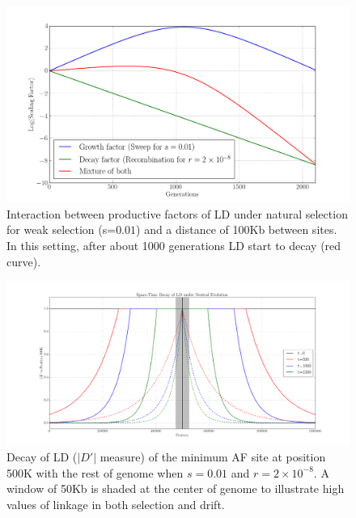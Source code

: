 \documentclass[11pt]{article}
\begin{document}
\begin{figure}
	\centering
	\includegraphics[width=\textwidth]{decayFactors}
	\caption{Interaction between productive factors of LD under natural 
	selection for weak selection (s=$0.01$) and a distance of 100Kb between 
	sites. In this setting, after about 1000 generations LD start to decay (red 
	curve).} \label{fig:ldf}
\end{figure}


\begin{figure}
	\centering
	\includegraphics[width=\textwidth]{LDDecay2d}
	\caption{Decay of LD ($|D'|$ measure) of the minimum AF site at position 
	500K with the rest of genome when $s=0.01$ and $r=2\times10^{-8}$. A window 
	of 50Kb is shaded at the center of genome to illustrate high values of 
	linkage in both selection and drift.} \label{fig:ld2d}
\end{figure}
\end{document}
